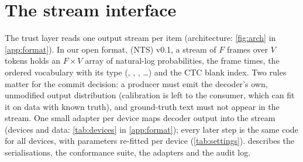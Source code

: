 \section{The stream interface}
\label{sec:format}

The trust layer reads one output stream per item (architecture: \cref{fig:arch} in \cref{app:format}). In our open format, \nts{} (NTS) v0.1, a stream of $F$ frames over $V$ tokens holds an $F \times V$ array of natural-log probabilities, the frame times, the ordered vocabulary with its type (, , , \ldots) and the CTC blank index. Two rules matter for the commit decision: a producer must emit the decoder's own, unmodified output distribution (calibration is left to the consumer, which can fit it on data with known truth), and ground-truth text must not appear in the stream. One small adapter per device maps decoder output into the stream (devices and data: \cref{tab:devices} in \cref{app:format}); every later step is the same code for all devices, with parameters re-fitted per device (\cref{tab:settings}).  describes the serialisations, the conformance suite, the adapters and the audit log.
